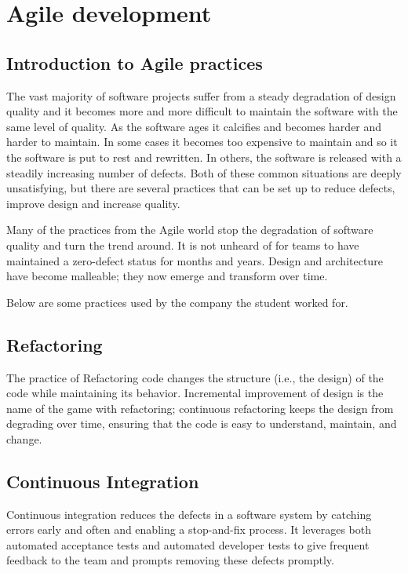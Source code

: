 \chapter{Agile development}
\label{ch:startup}

\section{Introduction to Agile practices}
The vast majority of software projects suffer from a steady degradation of design quality and it becomes more and more difficult to maintain the software with the same level of quality. As the software ages it calcifies and becomes harder and harder to maintain. In some cases it becomes too expensive to maintain and so it the software is put to rest and rewritten. In others, the software is released with a steadily increasing number of defects. Both of these common situations are deeply unsatisfying, but there are several practices that can be set up to reduce defects, improve design and increase quality.

Many of the practices from the Agile world stop the degradation of software quality and turn the trend around. It is not unheard of for teams to have maintained a zero-defect status for months and years. Design and architecture have become malleable; they now emerge and transform over time. 

Below are some practices used by the company the student worked for.

\section{Refactoring}
The practice of Refactoring code changes the structure (i.e., the design) of the code while maintaining its behavior. Incremental improvement of design is the name of the game with refactoring; continuous refactoring keeps the design from degrading over time, ensuring that the code is easy to understand, maintain, and change.

\section{Continuous Integration}
Continuous integration reduces the defects in a software system by catching errors early and often and enabling a stop-and-fix process. It leverages both automated acceptance tests and automated developer tests to give frequent feedback to the team and prompts removing these defects promptly.

